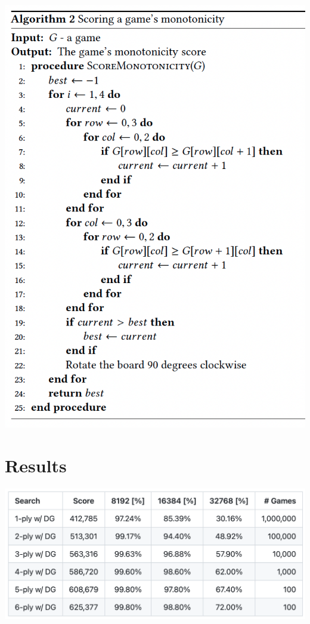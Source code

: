\documentclass[letterpaper]{article} %
\begin{document}
\begin{center}
    \includegraphics[scale=.7]{images/monotonicity.png}
\end{center}

\section{Results}

\begin{center}
    \includegraphics[scale=.4]{images/result-table.png}
\end{center}
\end{document}
